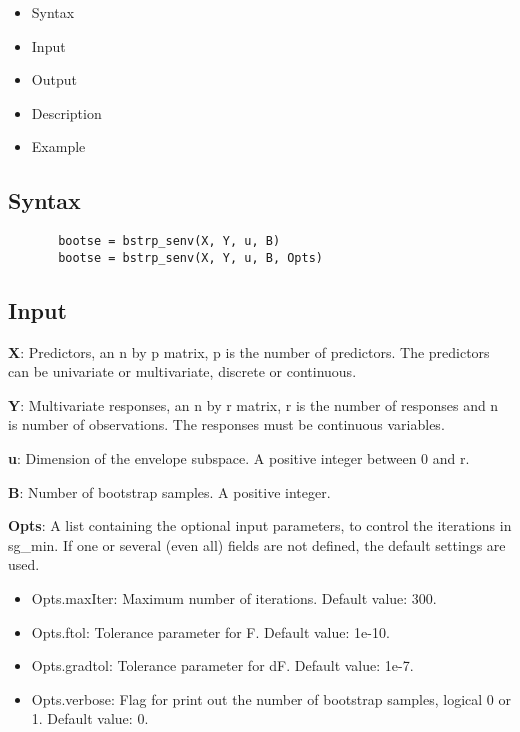 \documentclass[a4paper,11pt,openany]{memoir}
\begin{document}
\begin{itemize}
\setlength{\itemsep}{-1ex}
   \item Syntax
   \item Input
   \item Output
   \item Description
   \item Example
\end{itemize}


\subsection*{Syntax}


\begin{verbatim}       bootse = bstrp_senv(X, Y, u, B)
       bootse = bstrp_senv(X, Y, u, B, Opts)\end{verbatim}
    

\subsection*{Input}

\begin{par}
\textbf{X}: Predictors, an n by p matrix, p is the number of predictors.  The predictors can be univariate or multivariate, discrete or continuous.
\end{par} \vspace{1em}
\begin{par}
\textbf{Y}: Multivariate responses, an n by r matrix, r is the number of responses and n is number of observations.  The responses must be continuous variables.
\end{par} \vspace{1em}
\begin{par}
\textbf{u}: Dimension of the envelope subspace.  A positive integer between 0 and r.
\end{par} \vspace{1em}
\begin{par}
\textbf{B}: Number of bootstrap samples.  A positive integer.
\end{par} \vspace{1em}
\begin{par}
\textbf{Opts}: A list containing the optional input parameters, to control the iterations in sg\_min. If one or several (even all) fields are not defined, the default settings are used.
\end{par} \vspace{1em}
\begin{itemize}
\setlength{\itemsep}{-1ex}
   \item Opts.maxIter: Maximum number of iterations.  Default value: 300.
   \item Opts.ftol: Tolerance parameter for F.  Default value: 1e-10.
   \item Opts.gradtol: Tolerance parameter for dF.  Default value: 1e-7.
   \item Opts.verbose: Flag for print out the number of bootstrap samples, logical 0 or 1. Default value: 0.
\end{itemize}
\end{document}
